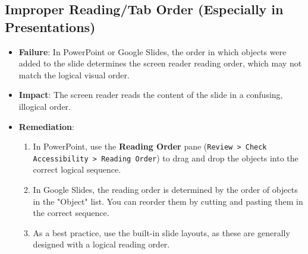 \subsection{Improper Reading/Tab Order (Especially in Presentations)}
\label{subsec:failures-reading-order}
\begin{itemize}
	\item \textbf{Failure}: In PowerPoint or Google Slides, the order in which objects were added to the slide determines the screen reader reading order, which may not match the logical visual order.
	\item \textbf{Impact}: The screen reader reads the content of the slide in a confusing, illogical order.
	\item \textbf{Remediation}:
	      \begin{enumerate}
		      \item In PowerPoint, use the \textbf{Reading Order} pane (\texttt{Review > Check Accessibility > Reading Order}) to drag and drop the objects into the correct logical sequence.
		      \item In Google Slides, the reading order is determined by the order of objects in the "Object" list. You can reorder them by cutting and pasting them in the correct sequence.
		      \item As a best practice, use the built-in slide layouts, as these are generally designed with a logical reading order.
	      \end{enumerate}
\end{itemize}

